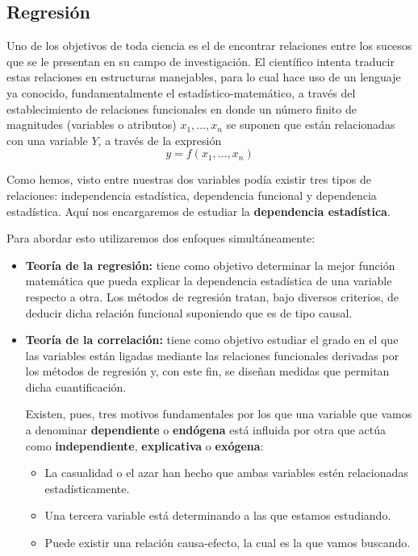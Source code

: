 \documentclass[10pt, a4paper]{article}
\theoremstyle{theorem-style}
\theoremstyle{definition-style}
\theoremstyle{remark-style}
\theoremstyle{example-style}
\theoremstyle{definition-style}
\theoremstyle{remark-style}
\begin{document}
\pagebreak

\subsection{Regresión}

Uno de los objetivos de toda ciencia es el de encontrar relaciones entre los
sucesos que se le presentan en su campo de investigación.
El científico intenta traducir estas relaciones en estructuras manejables, para
lo cual hace uso de un lenguaje ya conocido, fundamentalmente el
estadístico-matemático, a través del establecimiento de relaciones funcionales
en donde un número finito de magnitudes (variables o atributos) $x_1, \ldots,
x_n$ se suponen que están relacionadas con una variable $Y$, a través de la
expresión $$y = f(x_1, \ldots, x_n)$$

	Como hemos, visto entre nuestras dos variables podía existir tres tipos de
	relaciones: independencia estadística, dependencia funcional y dependencia
	estadística. Aquí nos encargaremos de estudiar la \textbf{dependencia estadística}.
	\vspace{2mm}

	Para abordar esto utilizaremos dos enfoques simultáneamente:

\begin{itemize}
	 \item \textbf{Teoría de la regresión:} tiene como objetivo determinar la mejor
	 función matemática que pueda explicar la dependencia estadística de una
	 variable respecto a otra. Los métodos de regresión tratan, bajo diversos
	 criterios, de deducir dicha relación funcional suponiendo que es de tipo
	 causal.

	 \item \textbf{Teoría de la correlación:} tiene como objetivo
	 estudiar el grado en el que las variables están ligadas mediante las
	 relaciones funcionales derivadas por los métodos de regresión y, con este
	 fin, se diseñan medidas que permitan dicha cuantificación.

	 \vspace{2mm}
	 Existen, pues, tres motivos fundamentales por los que una
	 variable que vamos a denominar \textbf{dependiente} o \textbf{endógena} está influida por otra
	 que actúa como \textbf{independiente}, \textbf{explicativa} o \textbf{exógena}:

	 \begin{itemize}

	 \item La casualidad o el azar han hecho que ambas variables estén
	 relacionadas estadísticamente.
	 \item Una tercera variable está determinando a las que estamos estudiando.
	 \item Puede existir una relación causa-efecto, la cual es la que vamos buscando.

 		\end{itemize}

\end{itemize}
\end{document}
